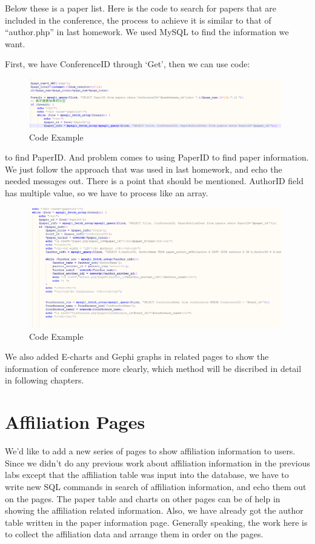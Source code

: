 \documentclass{book}
\begin{document}
Below these is a paper list.
Here is the code to search for papers that are included in the conference, the process to achieve  it is similar to that of ``author.php'' in last homework. We used MySQL to find the information we want. 

First, we have ConferenceID through `Get', then we can use code:
\begin{figure}[H]
\centering
\includegraphics[width=11.0cm]{img/yhb_con_11.png}
\caption{Code Example}
\end{figure}


to find PaperID. And problem comes to using PaperID to find paper information.  We just follow the approach that was used in last homework, and echo the needed messages out. There is a point that should be mentioned. AuthorID field has multiple value, so we have to process like an array.
\begin{figure}[H]
\centering
\includegraphics[width=11.0cm]{img/yhb_con_1.png}
\caption{Code Example}
\end{figure}


We also added E-charts and Gephi graphs in related pages to show the information of conference more clearly, which method will be discribed in detail in following chapters.

\section {Affiliation Pages}

We'd like to add a new series of pages to show affiliation information to users. Since we didn't do any previous work about affiliation information in the previous labs except that the affiliation table was input into the database, we have to write new SQL commands in search of affiliation information, and echo them out on the pages. The paper table and charts on other pages can be of help in showing the affiliation related information. Also, we have already got the author table written in the paper information page. Generally speaking, the work here is to collect the affiliation data and arrange them in order on the pages.
\end{document}
